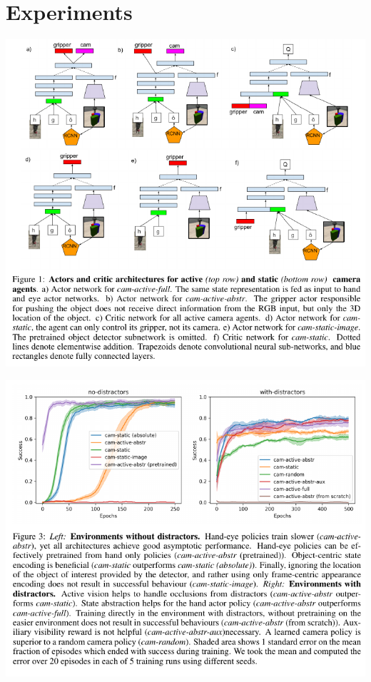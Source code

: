 \documentclass[11pt]{article}
\begin{document}
\section{Experiments}

\begin{center}
\includegraphics[scale=.4]{fig01}

\bigskip

\includegraphics[scale=.4]{fig03}
\end{center}




\end{document}
